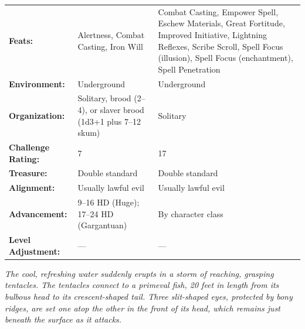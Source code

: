 \documentclass[DIV=14, paper=a4, fontsize=10pt, twocolumn, twoside]{scrartcl}
\begin{document}
\begin{table}[th!]
\begin{tabular}{p{3.5cm}p{5.5cm}p{6cm}}
		\textbf{Feats:} & Alertness, Combat Casting, Iron Will & Combat Casting, Empower Spell, Eschew Materials, Great Fortitude, Improved Initiative, Lightning Reflexes, Scribe Scroll, Spell Focus (illusion), Spell Focus (enchantment), Spell Penetration\\
		\rowcolor{Tan!50}
		\textbf{Environment:} & Underground & Underground\\
		\textbf{Organization:} & Solitary, brood (2–4), or slaver brood (1d3+1 plus 7–12 skum) & Solitary\\
		\rowcolor{Tan!50}
		\textbf{Challenge Rating:} & 7 & 17\\
		\textbf{Treasure:} & Double standard & Double standard\\
		\rowcolor{Tan!50}
		\textbf{Alignment:} & Usually lawful evil & Usually lawful evil\\
		\textbf{Advancement:} & 9–16 HD (Huge); 17–24 HD (Gargantuan) & By character class\\
		\rowcolor{Tan!50}
		\textbf{Level Adjustment:} & — & —
	\end{tabular}
\end{table}

\noindent\textit{The cool, refreshing water suddenly erupts in a storm of reaching, grasping tentacles. The tentacles connect to a primeval fish, 20 feet in length from its bulbous head to its crescent-shaped tail. Three slit-shaped eyes, protected by bony ridges, are set one atop the other in the front of its head, which remains just beneath the surface as it attacks.}\\
\end{document}
